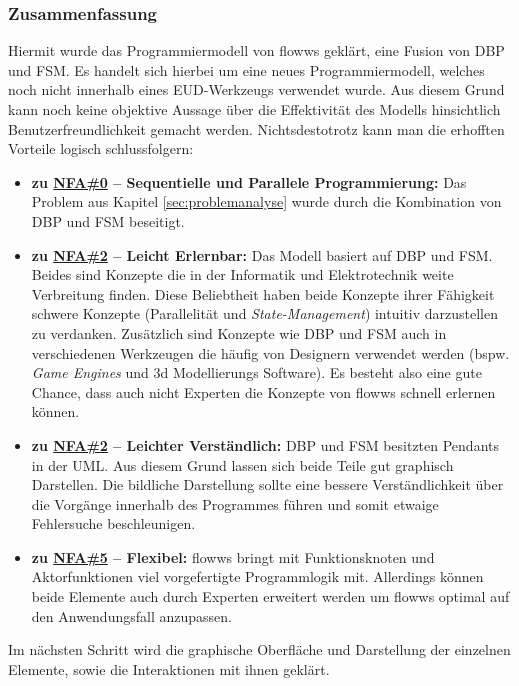 \subsubsection{Zusammenfassung}
Hiermit wurde das Programmiermodell von flowws geklärt, eine Fusion von \ac{DBP} und \ac{FSM}. Es handelt sich hierbei um eine neues Programmiermodell, welches noch nicht innerhalb eines \ac{EUD}-Werkzeugs verwendet wurde. Aus diesem Grund kann noch keine objektive Aussage über die Effektivität des Modells hinsichtlich Benutzerfreundlichkeit gemacht werden. Nichtsdestotrotz kann man die erhofften Vorteile logisch schlussfolgern:
\begin{itemize}
    \item \textbf{zu \hyperref[tab:NFA0]{NFA\#0} -- Sequentielle und Parallele Programmierung:} Das Problem aus Kapitel \ref{sec:problemanalyse} wurde durch die Kombination von \ac{DBP} und \ac{FSM} beseitigt.
    \item \textbf{zu \hyperref[tab:NFA2]{NFA\#2} -- Leicht Erlernbar:} Das Modell basiert auf \ac{DBP} und \ac{FSM}. Beides sind Konzepte die in der Informatik und Elektrotechnik weite Verbreitung finden. Diese Beliebtheit haben beide Konzepte ihrer Fähigkeit schwere Konzepte (Parallelität und \textit{State-Management}) intuitiv darzustellen zu verdanken. Zusätzlich sind Konzepte wie \ac{DBP} und \ac{FSM} auch in verschiedenen Werkzeugen die häufig von Designern verwendet werden (bspw. \textit{Game Engines} und 3d Modellierungs Software). Es besteht also eine gute Chance, dass auch nicht Experten die Konzepte von flowws schnell erlernen können.
    \item \textbf{zu \hyperref[tab:NFA2]{NFA\#2} -- Leichter Verständlich:} \ac{DBP} und \ac{FSM} besitzten Pendants in der UML. Aus diesem Grund lassen sich beide Teile gut graphisch Darstellen. Die bildliche Darstellung sollte eine bessere Verständlichkeit über die Vorgänge innerhalb des Programmes führen und somit etwaige Fehlersuche beschleunigen.
    \item \textbf{zu \hyperref[tab:NFA5]{NFA\#5} -- Flexibel:} flowws bringt mit Funktionsknoten und Aktorfunktionen viel vorgefertigte Programmlogik mit. Allerdings können beide Elemente auch durch Experten erweitert werden um flowws optimal auf den Anwendungsfall anzupassen.
   
\end{itemize}

Im nächsten Schritt wird die graphische Oberfläche und Darstellung der einzelnen Elemente, sowie die Interaktionen mit ihnen geklärt.